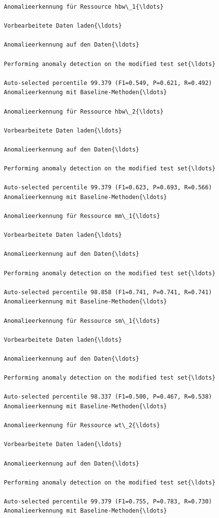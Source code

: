 \documentclass[11pt]{article}
\begin{document}
    \begin{Verbatim}[commandchars=\\\{\}]
Anomalieerkennung für Ressource hbw\_1{\ldots}

Vorbearbeitete Daten laden{\ldots}

Anomalieerkennung auf den Daten{\ldots}

Performing anomaly detection on the modified test set{\ldots}

Auto-selected percentile 99.379 (F1=0.549, P=0.621, R=0.492)
Anomalieerkennung mit Baseline-Methoden{\ldots}

Anomalieerkennung für Ressource hbw\_2{\ldots}

Vorbearbeitete Daten laden{\ldots}

Anomalieerkennung auf den Daten{\ldots}

Performing anomaly detection on the modified test set{\ldots}

Auto-selected percentile 99.379 (F1=0.623, P=0.693, R=0.566)
Anomalieerkennung mit Baseline-Methoden{\ldots}

Anomalieerkennung für Ressource mm\_1{\ldots}

Vorbearbeitete Daten laden{\ldots}

Anomalieerkennung auf den Daten{\ldots}

Performing anomaly detection on the modified test set{\ldots}

Auto-selected percentile 98.858 (F1=0.741, P=0.741, R=0.741)
Anomalieerkennung mit Baseline-Methoden{\ldots}

Anomalieerkennung für Ressource sm\_1{\ldots}

Vorbearbeitete Daten laden{\ldots}

Anomalieerkennung auf den Daten{\ldots}

Performing anomaly detection on the modified test set{\ldots}

Auto-selected percentile 98.337 (F1=0.500, P=0.467, R=0.538)
Anomalieerkennung mit Baseline-Methoden{\ldots}

Anomalieerkennung für Ressource wt\_2{\ldots}

Vorbearbeitete Daten laden{\ldots}

Anomalieerkennung auf den Daten{\ldots}

Performing anomaly detection on the modified test set{\ldots}

Auto-selected percentile 99.379 (F1=0.755, P=0.783, R=0.730)
Anomalieerkennung mit Baseline-Methoden{\ldots}


\end{Verbatim}
\end{document}
